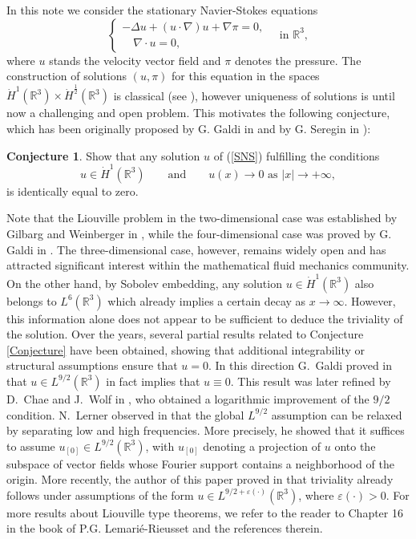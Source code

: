 \documentclass[a4paper,12pt]{amsart}
\theoremstyle{definition}
\newtheorem{conjecture}{Conjecture}[section]
\theoremstyle{plain}
\def\R{\mathbb{R}}
\def\R{\mathbb R}
\def\vu{ u }
\begin{document}
 	In this note we consider the stationary Navier-Stokes equations 
	\begin{equation}\label{SNS}
		\begin{cases}
			-\Delta u+  ( u\cdot \nabla ) u +\nabla \pi  =0,
			\\
			\quad \nabla \cdot u=0, 
		\end{cases}
		\quad 
		\text{in }\R^3,
	\end{equation} 
 where $\vu $ stands the velocity vector field and $\pi  $ denotes the  pressure. The construction of solutions $(\vu, \pi)$ for this equation in the spaces $\dot{H}^1(\mathbb{R}^3) \times \dot{H}^{\frac{1}{2}}(\R^3) $  is classical (see \cite[Theorem 16.2]{lemarie2016navier}), however  uniqueness of solutions is  until now a challenging and open problem. This motivates the following conjecture, which has been originally proposed by G. Galdi in \cite[Remark X.9.4 and Theorem X.9.5]{galdi2011introduction} and by G. Seregin in \cite{Ser2016}):
\begin{conjecture}
Show that any solution $\vu$ of (\ref{SNS}) fulfilling the conditions
\begin{equation}\label{Conjecture}
\vu \in \dot{H}^1(\R^3) \qquad\mbox{and}\qquad \vu(x)\to 0 \mbox{ as } |x|\to +\infty,
\end{equation}
is identically equal to zero.
\end{conjecture}
Note that the Liouville problem in the two-dimensional case was established by Gilbarg and Weinberger in \cite{GW78}, while the four-dimensional case was proved by G. Galdi in \cite{galdi2011introduction}. The three-dimensional case, however, remains widely open and has attracted significant interest within the mathematical fluid mechanics community.
On the other hand, by Sobolev embedding, any solution
 $u \in \dot{H}^1(\mathbb{R}^3)$ also belongs to $L^6(\mathbb{R}^3)$ which already implies a certain decay as $x\to \infty$. However, this information alone does not appear to be sufficient to deduce the triviality of the solution. Over the years, several partial results related to Conjecture \ref{Conjecture} have been obtained, showing that additional integrability or structural assumptions ensure that $u=0$. In this direction  G.~Galdi  proved in \cite{galdi2011introduction} that $u \in L^{9/2}(\mathbb{R}^3)$ in fact implies  that $u \equiv 0$. This result was later refined by D.~Chae and J.~Wolf in \cite{ChaeWolf}, who obtained a logarithmic improvement of the $9/2$ condition.    N.~Lerner observed in \cite{Lerner26} that the global $L^{9/2}$ assumption can be relaxed by separating low and high frequencies. More precisely, he showed that it suffices to assume $u_{[0]} \in L^{9/2}(\R^3)$, with  $u_{[0]}$ denoting a projection of $u$ onto the subspace of vector fields whose Fourier support contains a neighborhood of the origin. More recently, the author of this paper  proved in \cite{V2026} that triviality already follows under assumptions of the form $u \in L^{9/2 + \varepsilon(\cdot)}(\mathbb{R}^3)$, where $\varepsilon(\cdot)>0$.  For more results about Liouville type theorems, we refer to the reader to Chapter 16 in the book of P.G. Lemari\'e-Rieusset \cite{lemarie2016navier} and the references therein.\\ 
\end{document}
